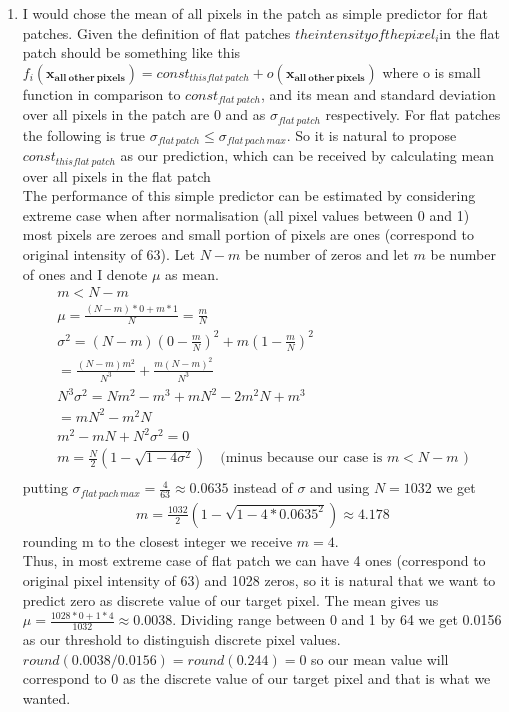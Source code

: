 \documentclass{article}
\newcommand{\vect}[1]{\boldsymbol{#1}} %
\begin{document}
\begin{enumerate}[label=(\alph*)]
				\item
					I would chose the mean of all pixels in the patch as simple predictor for flat patches. Given the definition of flat patches $the intensity of the pixel_{i}$in the flat patch should be something like this $f_{i}(\vect{x_{all\ other\ pixels}}) = const_{this flat\ patch} + o(\vect{x_{all\ other\ pixels}})$ where o is small function in comparison to $const_{flat\ patch}$, and its mean and standard deviation over all pixels in the patch are 0 and as $\sigma_{flat\ patch}$ respectively. For flat patches the following is true $\sigma_{flat \, patch} \leq \sigma_{flat \, pach \, max}$. So it is natural to propose  $const_{this flat\ patch}$ as our prediction, which can be received by calculating mean over all pixels in the flat patch\\
					The performance of this simple predictor can be estimated by considering extreme case when after normalisation (all pixel values between 0 and 1) most pixels are zeroes and small portion of pixels are ones (correspond to original intensity of 63). Let $N-m$ be number of zeros and let $m$ be number of ones and I denote $\mu$ as mean. 
					\begin{gather*}
						m < N - m\\
						\mu = \frac{(N - m) * 0 + m * 1}{N} = \frac{m}{N}\\
						\sigma^2 = (N - m) (0 - \frac{m}{N})^2 + m(1 - \frac{m}{N})^2 \\
						= \frac{(N - m)m^2}{N^3} + \frac{m(N - m)^2}{N ^ 3}\\
						N^3\sigma^2 = Nm^2 - m^3 + mN^2 - 2m^2N + m^3 \\
						= mN^2-m^2N\\
						m^2 - mN + N^2\sigma^2 = 0\\
						m = \frac{N}{2}(1 - \sqrt{1 - 4 \sigma ^ 2})\quad\text{(minus because our case is $m < N - m$ )}\\
					\end{gather*}
					putting $\sigma_{flat \, pach \, max} = \frac{4}{63} \approx 0.0635$ instead of $\sigma$ and using $N = 1032$ we get
					\begin{gather*}
						m = \frac{1032}{2}(1 - \sqrt{1 - 4 * 0.0635^2}) \approx 4.178
					\end{gather*}
					rounding m to the closest integer we receive $m = 4$. \\Thus, in most extreme case of flat patch we can have 4 ones (correspond to original pixel intensity of 63) and 1028 zeros, so it is natural that we want to predict zero as discrete value of our target pixel.  The mean gives us $\mu = \frac{1028 * 0 + 1 * 4} {1032} \approx 0.0038$. Dividing range between 0 and 1 by 64 we get 0.0156 as our threshold to distinguish discrete pixel values. $round(0.0038/0.0156)=round(0.244)=0$ so our mean value will correspond to 0 as the discrete value of our target pixel and that is what we wanted.

\end{enumerate}
\end{document}
